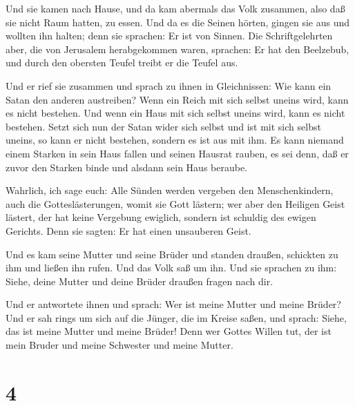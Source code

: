  Und sie kamen nach Hause, und da kam abermals das Volk
zusammen, also daß sie nicht Raum hatten, zu essen.  Und da
es die Seinen hörten, gingen sie aus und wollten ihn halten; denn sie
sprachen: Er ist von Sinnen.  Die Schriftgelehrten aber,
die von Jerusalem herabgekommen waren, sprachen: Er hat den Beelzebub,
und durch den obersten Teufel treibt er die Teufel aus.

 Und er rief sie zusammen und sprach zu ihnen in
Gleichnissen: Wie kann ein Satan den anderen austreiben? 
Wenn ein Reich mit sich selbst uneins wird, kann es nicht bestehen.
 Und wenn ein Haus mit sich selbst uneins wird, kann es
nicht bestehen.  Setzt sich nun der Satan wider sich selbst
und ist mit sich selbst uneins, so kann er nicht bestehen, sondern es
ist aus mit ihm.  Es kann niemand einem Starken in sein
Haus fallen und seinen Hausrat rauben, es sei denn, daß er zuvor den
Starken binde und alsdann sein Haus beraube.

 Wahrlich, ich sage euch: Alle Sünden werden vergeben den
Menschenkindern, auch die Gotteslästerungen, womit sie Gott lästern;
 wer aber den Heiligen Geist lästert, der hat keine
Vergebung ewiglich, sondern ist schuldig des ewigen Gerichts.
 Denn sie sagten: Er hat einen unsauberen Geist.

 Und es kam seine Mutter und seine Brüder und standen
draußen, schickten zu ihm und ließen ihn rufen.  Und das
Volk saß um ihn. Und sie sprachen zu ihm: Siehe, deine Mutter und deine
Brüder draußen fragen nach dir.

 Und er antwortete ihnen und sprach: Wer ist meine Mutter
und meine Brüder?  Und er sah rings um sich auf die Jünger,
die im Kreise saßen, und sprach: Siehe, das ist meine Mutter und meine
Brüder!  Denn wer Gottes Willen tut, der ist mein Bruder
und meine Schwester und meine Mutter.

\hypertarget{section-3}{%
\section{4}\label{section-3}}

